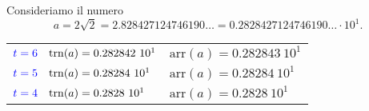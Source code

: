 \documentclass[a4paper,12pt]{article}
\theoremstyle{plain}
\theoremstyle{definition}
\theoremstyle{remark}
\begin{document}
\vspace{1cm}

 Consideriamo il numero
$$ a = 2\sqrt{2} = 2.828427124746190\dots = 0.2828427124746190\dots \cdot 10^1. $$

\begin{tabular}{ll}
${\color{blue}t=6} \quad \mathrm{trn}(a) = 0.282842 \ 10^1$ & $\mathrm{arr}(a) = 0.282843 \ 10^1$ \\
${\color{blue}t=5} \quad \mathrm{trn}(a) = 0.28284 \ 10^1$ & $\mathrm{arr}(a) = 0.28284 \ 10^1$ \\
${\color{blue}t=4} \quad \mathrm{trn}(a) = 0.2828 \ 10^1$ & $\mathrm{arr}(a) = 0.2828 \ 10^1$ \\
\end{tabular}
\end{document}
